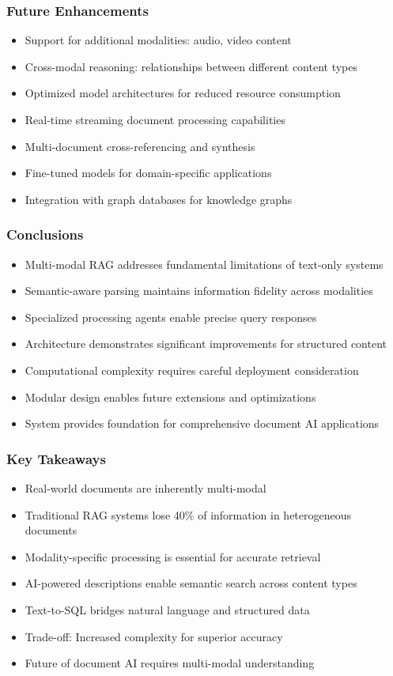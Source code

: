 \begin{frame}[fragile]\frametitle{Future Enhancements}
\begin{itemize}
\item Support for additional modalities: audio, video content
\item Cross-modal reasoning: relationships between different content types
\item Optimized model architectures for reduced resource consumption
\item Real-time streaming document processing capabilities
\item Multi-document cross-referencing and synthesis
\item Fine-tuned models for domain-specific applications
\item Integration with graph databases for knowledge graphs
\end{itemize}
\end{frame}

\begin{frame}[fragile]\frametitle{Conclusions}
\begin{itemize}
\item Multi-modal RAG addresses fundamental limitations of text-only systems
\item Semantic-aware parsing maintains information fidelity across modalities
\item Specialized processing agents enable precise query responses
\item Architecture demonstrates significant improvements for structured content
\item Computational complexity requires careful deployment consideration
\item Modular design enables future extensions and optimizations
\item System provides foundation for comprehensive document AI applications
\end{itemize}
\end{frame}

\begin{frame}[fragile]\frametitle{Key Takeaways}
\begin{itemize}
\item Real-world documents are inherently multi-modal
\item Traditional RAG systems lose 40\% of information in heterogeneous documents
\item Modality-specific processing is essential for accurate retrieval
\item AI-powered descriptions enable semantic search across content types
\item Text-to-SQL bridges natural language and structured data
\item Trade-off: Increased complexity for superior accuracy
\item Future of document AI requires multi-modal understanding
\end{itemize}
\end{frame}